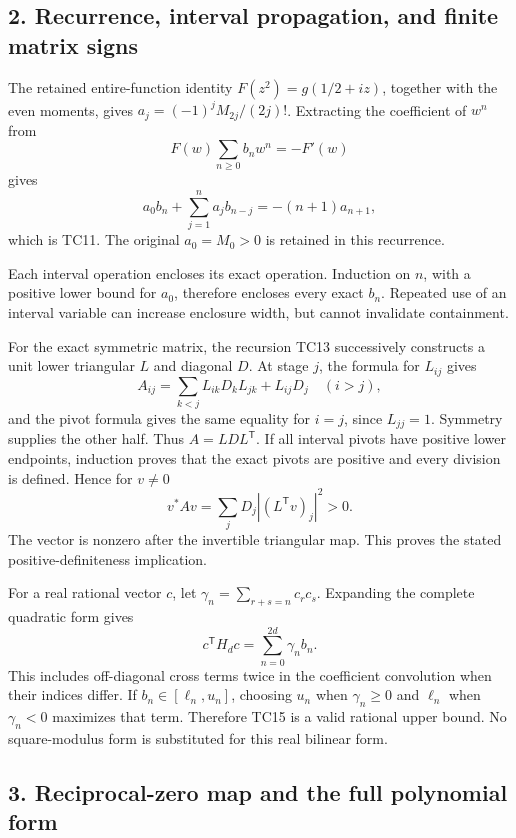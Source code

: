 \subsection{2. Recurrence, interval propagation, and finite matrix signs}\label{C47stage:TCReview:recurrence-interval-propagation-and-finite-matrix-signs}

The retained entire-function identity \(F(z^2)=g(1/2+iz)\), together with the even moments, gives \(a_j=(-1)^jM_{2j}/(2j)!\). Extracting the coefficient of \(w^n\) from \[
F(w)\sum_{n\ge0}b_nw^n=-F'(w)
\] gives \[
a_0b_n+\sum_{j=1}^{n}a_jb_{n-j}=-(n+1)a_{n+1},
\tag{TR9}
\] which is TC11. The original \(a_0=M_0>0\) is retained in this recurrence.

Each interval operation encloses its exact operation. Induction on \(n\), with a positive lower bound for \(a_0\), therefore encloses every exact \(b_n\). Repeated use of an interval variable can increase enclosure width, but cannot invalidate containment.

For the exact symmetric matrix, the recursion TC13 successively constructs a unit lower triangular \(L\) and diagonal \(D\). At stage \(j\), the formula for \(L_{ij}\) gives \[
A_{ij}=\sum_{k<j}L_{ik}D_kL_{jk}+L_{ij}D_j
\quad(i>j),
\] and the pivot formula gives the same equality for \(i=j\), since \(L_{jj}=1\). Symmetry supplies the other half. Thus \(A=LDL^{\mathsf T}\). If all interval pivots have positive lower endpoints, induction proves that the exact pivots are positive and every division is defined. Hence for \(v\ne0\) \[
v^*Av=\sum_jD_j|(L^{\mathsf T}v)_j|^2>0.
\tag{TR10}
\] The vector is nonzero after the invertible triangular map. This proves the stated positive-definiteness implication.

For a real rational vector \(c\), let \(\gamma_n=\sum_{r+s=n}c_rc_s\). Expanding the complete quadratic form gives \[
c^{\mathsf T}H_dc=\sum_{n=0}^{2d}\gamma_nb_n.
\tag{TR11}
\] This includes off-diagonal cross terms twice in the coefficient convolution when their indices differ. If \(b_n\in[\ell_n,u_n]\), choosing \(u_n\) when \(\gamma_n\ge0\) and \(\ell_n\) when \(\gamma_n<0\) maximizes that term. Therefore TC15 is a valid rational upper bound. No square-modulus form is substituted for this real bilinear form.

\subsection{3. Reciprocal-zero map and the full polynomial form}\label{C47stage:TCReview:reciprocal-zero-map-and-the-full-polynomial-form}

